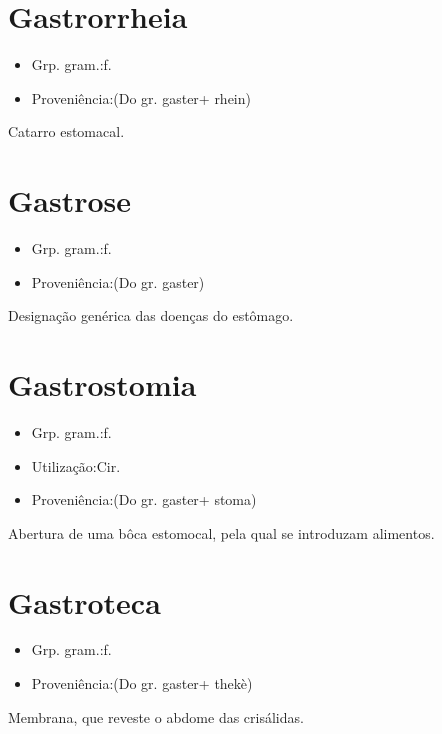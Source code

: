 \section{Gastrorrheia}
\begin{itemize}
\item {Grp. gram.:f.}
\end{itemize}
\begin{itemize}
\item {Proveniência:(Do gr. \textunderscore gaster\textunderscore  + \textunderscore rhein\textunderscore )}
\end{itemize}
Catarro estomacal.
\section{Gastrose}
\begin{itemize}
\item {Grp. gram.:f.}
\end{itemize}
\begin{itemize}
\item {Proveniência:(Do gr. \textunderscore gaster\textunderscore )}
\end{itemize}
Designação genérica das doenças do estômago.
\section{Gastrostomia}
\begin{itemize}
\item {Grp. gram.:f.}
\end{itemize}
\begin{itemize}
\item {Utilização:Cir.}
\end{itemize}
\begin{itemize}
\item {Proveniência:(Do gr. \textunderscore gaster\textunderscore  + \textunderscore stoma\textunderscore )}
\end{itemize}
Abertura de uma bôca estomocal, pela qual se introduzam alimentos.
\section{Gastroteca}
\begin{itemize}
\item {Grp. gram.:f.}
\end{itemize}
\begin{itemize}
\item {Proveniência:(Do gr. \textunderscore gaster\textunderscore  + \textunderscore thekè\textunderscore )}
\end{itemize}
Membrana, que reveste o abdome das crisálidas.
